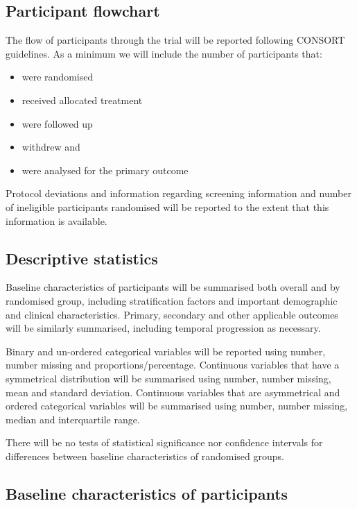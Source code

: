 \documentclass[a4paper]{article}
\begin{document}
\subsection{Participant flowchart}

The flow of participants through the trial will be reported following CONSORT guidelines.
As a minimum we will include the number of participants that: 

\begin{itemize}
    \item were randomised
    \item received allocated treatment
    \item were followed up
    \item withdrew and 
    \item were analysed for the primary outcome
\end{itemize}

Protocol deviations and information regarding screening information and number of ineligible participants randomised will be reported to the extent that this information is available.

\subsection{Descriptive statistics}

Baseline characteristics of participants will be summarised both overall and by randomised group, including stratification factors and important demographic and clinical characteristics.
Primary, secondary and other applicable outcomes will be similarly summarised, including temporal progression as necessary.

Binary and un-ordered categorical variables will be reported using number, number missing and proportions/percentage.
Continuous variables that have a symmetrical distribution will be summarised using number, number missing, mean and standard deviation.
Continuous variables that are asymmetrical and ordered categorical variables will be summarised using number, number missing, median and interquartile range.

There will be no tests of statistical significance nor confidence intervals for differences between baseline characteristics of randomised groups.

\subsection{Baseline characteristics of participants}
\end{document}
